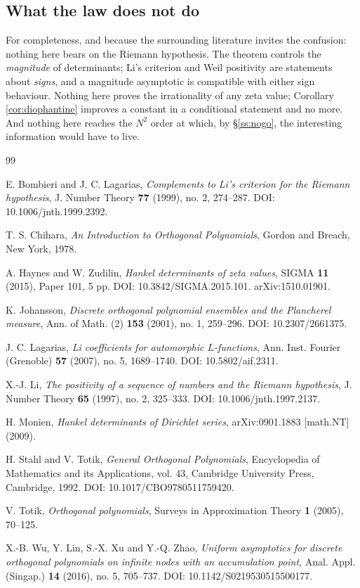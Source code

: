 \documentclass[11pt]{amsart}
\numberwithin{equation}{section}
\theoremstyle{plain}
\theoremstyle{definition}
\theoremstyle{remark}
\begin{document}
\subsection{What the law does not do}

For completeness, and because the surrounding literature invites the confusion: nothing here bears
on the Riemann hypothesis. The theorem controls the \emph{magnitude} of determinants; Li's criterion
and Weil positivity are statements about \emph{signs}, and a magnitude asymptotic is compatible with
either sign behaviour. Nothing here proves the irrationality of any zeta value; Corollary
\ref{cor:diophantine} improves a constant in a conditional statement and no more. And nothing here
reaches the $N^{2}$ order at which, by \S\ref{ss:nogo}, the interesting information would have to
live.

\begin{thebibliography}{99}

E. Bombieri and J. C. Lagarias,
\emph{Complements to Li's criterion for the Riemann hypothesis},
J. Number Theory \textbf{77} (1999), no. 2, 274--287.
DOI: 10.1006/jnth.1999.2392.

T. S. Chihara,
\emph{An Introduction to Orthogonal Polynomials},
Gordon and Breach, New York, 1978.

A. Haynes and W. Zudilin,
\emph{Hankel determinants of zeta values},
SIGMA \textbf{11} (2015), Paper 101, 5 pp.
DOI: 10.3842/SIGMA.2015.101. arXiv:1510.01901.

K. Johansson,
\emph{Discrete orthogonal polynomial ensembles and the Plancherel measure},
Ann. of Math. (2) \textbf{153} (2001), no. 1, 259--296.
DOI: 10.2307/2661375.

J. C. Lagarias,
\emph{Li coefficients for automorphic $L$-functions},
Ann. Inst. Fourier (Grenoble) \textbf{57} (2007), no. 5, 1689--1740.
DOI: 10.5802/aif.2311.

X.-J. Li,
\emph{The positivity of a sequence of numbers and the Riemann hypothesis},
J. Number Theory \textbf{65} (1997), no. 2, 325--333.
DOI: 10.1006/jnth.1997.2137.

H. Monien,
\emph{Hankel determinants of Dirichlet series},
arXiv:0901.1883 [math.NT] (2009).

H. Stahl and V. Totik,
\emph{General Orthogonal Polynomials},
Encyclopedia of Mathematics and its Applications, vol. 43,
Cambridge University Press, Cambridge, 1992.
DOI: 10.1017/CBO9780511759420.

V. Totik,
\emph{Orthogonal polynomials},
Surveys in Approximation Theory \textbf{1} (2005), 70--125.

X.-B. Wu, Y. Lin, S.-X. Xu and Y.-Q. Zhao,
\emph{Uniform asymptotics for discrete orthogonal polynomials on infinite nodes with an
accumulation point},
Anal. Appl. (Singap.) \textbf{14} (2016), no. 5, 705--737.
DOI: 10.1142/S0219530515500177.

\end{thebibliography}
\end{document}
